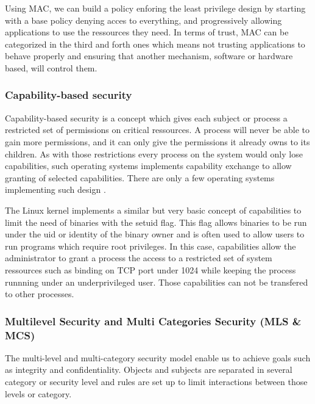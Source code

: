 \documentclass[pdftex,a4paper,titlepage,11pt]{article}
\begin{document}
\bigskip

Using MAC, we can build a policy enforing the least privilege design by
starting with a base policy denying acces to everything, and progressively
allowing applications to use the ressources they need. In terms of trust, MAC
can be categorized in the third and forth ones which means not trusting
applications to behave properly and ensuring that another mechanism, software or
hardware based, will control them.

\subsubsection{Capability-based security}

Capability-based security is a concept which gives each subject or process a
restricted set of permissions on critical ressources. A process will never be
able to gain more permissions, and it can only give the permissions it already
owns to its children. As with those restrictions every process on the
system would only lose capabilities, such operating systems implements
capability exchange to allow granting of selected capabilities. There are only
a few operating systems implementing such design \cite{capabilitycapsicum}.

\bigskip

The Linux kernel implements a similar but very basic concept of capabilities to
limit the need of binaries with the setuid flag. This flag allows binaries to be
run under the uid or identity of the binary owner and is often used to allow
users to run programs which require root privileges. In this case, capabilities
allow the administrator to grant a process the access to a restricted set of
system ressources such as binding on TCP port under 1024 while keeping the
process runnning under an underprivileged user. Those capabilities can not be
transfered to other processes.

\subsubsection{Multilevel Security and Multi Categories Security (MLS \& MCS)}

The multi-level and multi-category security model enable us to achieve goals
such as integrity and confidentiality. Objects and subjects are separated in
several category or security level and rules are set up to limit interactions
between those levels or category.

\bigskip
\end{document}
